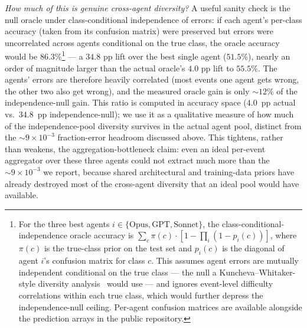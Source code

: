 \documentclass[universe,article,submit,pdftex,oneauthor]{Definitions/mdpi}
\begin{document}
\emph{How much of this is genuine cross-agent diversity?} A useful sanity check is the null oracle under class-conditional independence of errors: if each agent's per-class accuracy (taken from its confusion matrix) were preserved but errors were uncorrelated across agents conditional on the true class, the oracle accuracy would be $86.3\%$\footnote{For the three best agents $i \in \{\mathrm{Opus}, \mathrm{GPT}, \mathrm{Sonnet}\}$, the class-conditional-independence oracle accuracy is $\sum_c \pi(c) \cdot [1 - \prod_{i} (1 - p_i(c))]$, where $\pi(c)$ is the true-class prior on the test set and $p_i(c)$ is the diagonal of agent $i$'s confusion matrix for class $c$. This assumes agent errors are mutually independent conditional on the true class --- the null a Kuncheva--Whitaker-style diversity analysis~\cite{kuncheva_diversity} would use --- and ignores event-level difficulty correlations within each true class, which would further depress the independence-null ceiling. Per-agent confusion matrices are available alongside the prediction arrays in the public repository.} --- a $34.8$ pp lift over the best single agent ($51.5\%$), nearly an order of magnitude larger than the actual oracle's $4.0$ pp lift to $55.5\%$. The agents' errors are therefore heavily correlated (most events one agent gets wrong, the other two also get wrong), and the measured oracle gain is only ${\sim}12\%$ of the independence-null gain. This ratio is computed in accuracy space ($4.0$~pp actual vs.\ $34.8$~pp independence-null); we use it as a qualitative measure of how much of the independence-pool diversity survives in the actual agent pool, distinct from the ${\sim}9 \times 10^{-3}$ fraction-error headroom discussed above. This tightens, rather than weakens, the aggregation-bottleneck claim: even an ideal per-event aggregator over these three agents could not extract much more than the ${\sim}9 \times 10^{-3}$ we report, because shared architectural and training-data priors have already destroyed most of the cross-agent diversity that an ideal pool would have available.
\end{document}
